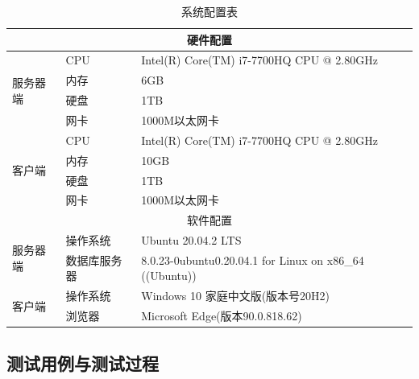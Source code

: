 \begin{table}[htbp]
  \centering
  \song\wuhao
  \caption{系统配置表}
  \begin{tabular}{|l|l|l|}
    \hline
    \multicolumn{3}{|c|}{硬件配置}                                                                     \\ \hline
    \multirow{4}{*}{服务器端} & CPU          & Intel(R) Core(TM) i7-7700HQ CPU @ 2.80GHz               \\ \cline{2-3}
                              & 内存         & 6GB                                                     \\ \cline{2-3}
                              & 硬盘         & 1TB                                                     \\ \cline{2-3}
                              & 网卡         & 1000M以太网卡                                           \\ \hline
    \multirow{4}{*}{客户端}   & CPU          & Intel(R) Core(TM) i7-7700HQ CPU @ 2.80GHz               \\ \cline{2-3}
                              & 内存         & 10GB                                                    \\ \cline{2-3}
                              & 硬盘         & 1TB                                                     \\ \cline{2-3}
                              & 网卡         & 1000M以太网卡                                           \\ \hline
    \multicolumn{3}{|c|}{软件配置}                                                                     \\ \hline
    \multirow{2}{*}{服务器端} & 操作系统     & Ubuntu 20.04.2 LTS                                      \\ \cline{2-3}
                              & 数据库服务器 & 8.0.23-0ubuntu0.20.04.1 for Linux on x86\_64 ((Ubuntu)) \\ \hline
    \multirow{2}{*}{客户端}   & 操作系统     & Windows 10 家庭中文版(版本号20H2)                       \\ \cline{2-3}
                              & 浏览器       & Microsoft Edge(版本90.0.818.62)                         \\ \hline
  \end{tabular}
\end{table}


\subsection{测试用例与测试过程}


